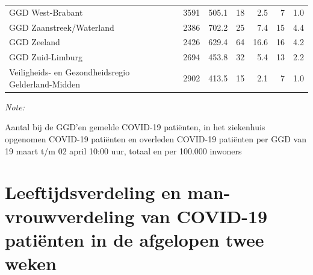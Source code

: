 \documentclass[
  english,
  man,floatsintext]{apa6}
\begin{document}
\begin{table}
\begin{threeparttable}
\begin{tabular}{lrrrrrr}
GGD West-Brabant & 3591 & 505.1 & 18 & 2.5 & 7 & 1.0\\
GGD Zaanstreek/Waterland & 2386 & 702.2 & 25 & 7.4 & 15 & 4.4\\
GGD Zeeland & 2426 & 629.4 & 64 & 16.6 & 16 & 4.2\\
GGD Zuid-Limburg & 2694 & 453.8 & 32 & 5.4 & 13 & 2.2\\
Veiligheids- en Gezondheidsregio Gelderland-Midden & 2902 & 413.5 & 15 & 2.1 & 7 & 1.0\\
\bottomrule
\end{tabular}
\begin{tablenotes}
\item \textit{Note: } 
\item Aantal bij de GGD’en gemelde COVID-19 patiënten, in het ziekenhuis opgenomen COVID-19 patiënten en overleden COVID-19 patiënten per GGD van 19 maart t/m 02 april 10:00 uur, totaal en per 100.000 inwoners
\end{tablenotes}
\end{threeparttable}
\endgroup{}
\end{table}

\newpage

\hypertarget{leeftijdsverdeling-en-man-vrouwverdeling-van-covid-19-patiuxebnten-in-de-afgelopen-twee-weken}{%
\section{Leeftijdsverdeling en man-vrouwverdeling van COVID-19 patiënten in de afgelopen twee weken}\label{leeftijdsverdeling-en-man-vrouwverdeling-van-covid-19-patiuxebnten-in-de-afgelopen-twee-weken}}
\end{document}
